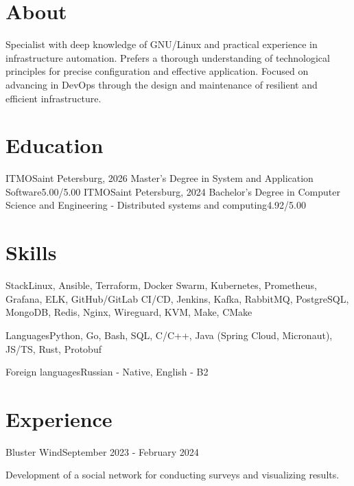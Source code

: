 \documentclass[letterpaper,11pt]{article}
\begin{document}
\section{About}
\resumeHeadingListStart
  \resumeHeadingAbout
  {Specialist with deep knowledge of GNU/Linux and practical experience in infrastructure automation. Prefers a thorough understanding of technological principles for precise configuration and effective application. Focused on advancing in DevOps through the design and maintenance of resilient and efficient infrastructure.}
\resumeHeadingListEnd

\section{Education}
\resumeHeadingListStart
  \resumeHeadingEducation
    {ITMO}{Saint Petersburg, 2026}
    {Master’s Degree in System and Application Software}{5.00/5.00}
  \resumeHeadingEducation
    {ITMO}{Saint Petersburg, 2024}
    {Bachelor’s Degree in Computer Science and Engineering - Distributed systems and computing}{4.92/5.00}
\resumeHeadingListEnd

\section{Skills}
\resumeHeadingListStart
  \resumeHeadingSkills
  {Stack}{Linux, Ansible, Terraform, Docker Swarm, Kubernetes, Prometheus, Grafana, ELK, GitHub/GitLab CI/CD, Jenkins, Kafka, RabbitMQ, PostgreSQL, MongoDB, Redis, Nginx, Wireguard, KVM, Make, CMake}

  \resumeHeadingSkills
  {Languages}{Python, Go, Bash, SQL, C/C++, Java (Spring Cloud, Micronaut), JS/TS, Rust, Protobuf}

  \resumeHeadingSkills
  {Foreign languages}{Russian - Native, English - B2}%
\resumeHeadingListEnd

\section{Experience}
\resumeHeadingListStart
  \resumeHeadingExperience
  {Bluster Wind}{September 2023 - February 2024}

  \resumeDescription
  {Development of a social network for conducting surveys and visualizing results.}
\end{document}
